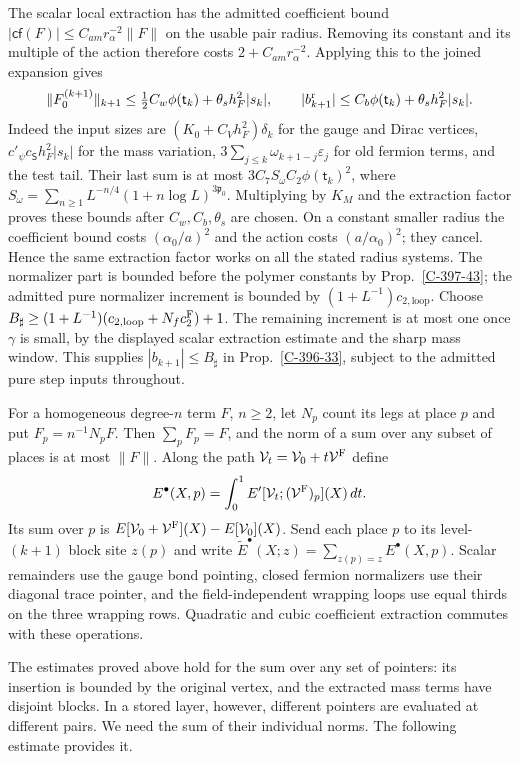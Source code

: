 \documentclass[11pt,letterpaper,reqno]{amsart}
\theoremstyle{definition}
\theoremstyle{remark}
\begin{document}
The scalar local extraction has the admitted coefficient
bound $|\mathsf{cf}(F)|\le C_{am}r_\alpha^{-2}\|F\|$ on
the usable pair radius.  Removing its constant and its
multiple of the action therefore costs
$2+C_{am}r_\alpha^{-2}$.  Applying this to the joined
expansion gives
\[
 \|F_0^{(k+1)}\|_{k+1}\le
       \tfrac12C_w\phi(\mathsf t_k)+\theta_sh_F^2|s_k|,
 \qquad |b_{k+1}^{\rm r}|\le
       C_b\phi(\mathsf t_k)+\theta_sh_F^2|s_k|.
\]
Indeed the input sizes are
$(K_0+C_Vh_F^2)\delta_k$ for the gauge and Dirac vertices,
$c'_\psi c_{\mathsf S}h_F^2|s_k|$ for the mass variation,
$3\sum_{j\le k}\omega_{k+1-j}\varepsilon_j$ for old
fermion terms, and the test tail.  Their last sum is at
most $3C_7S_\omega C_2\phi(\mathsf t_k)^2$, where
$S_\omega=\sum_{n\ge1}L^{-n/4}(1+n\log L)^{3\mathfrak p_0}$.
Multiplying by $K_M$ and the extraction factor proves
these bounds after $C_w,C_b,\theta_s$ are chosen.
On a constant smaller radius the coefficient bound
costs $(\alpha_0/a)^2$ and the action costs
$(a/\alpha_0)^2$; they cancel.  Hence the same extraction
factor works on all the stated radius systems.
The normalizer part is bounded before the polymer
constants by Prop.~\ref{C-397-43}; the admitted
pure normalizer increment is bounded by
$(1+L^{-1})c_{2,\mathrm{loop}}$.
Choose
$B_\sharp\ge(1+L^{-1})(c_{2,\mathrm{loop}}+
N_fc_2^{\rm F})+1$.
The remaining increment is at most one once
$\gamma$ is small, by the displayed scalar
extraction estimate and the sharp mass window.
This supplies $|b_{k+1}|\le B_\sharp$ in
Prop.~\ref{C-396-33}, subject to the
admitted pure step inputs throughout.

For a homogeneous degree-$n$ term $F$, $n\ge2$, let $N_p$
count its legs at place $p$ and put $F_p=n^{-1}N_pF$.
Then $\sum_pF_p=F$, and the norm of a sum over any subset
of places is at most $\|F\|$. Along the path
$\mathcal V_t=\mathcal V_0+t\mathcal V^{\rm F}$ define
\[
 E^\bullet(X,p)=\int_0^1
       E'[\mathcal V_t;(\mathcal V^{\rm F})_p](X)\,dt.
\]
Its sum over $p$ is
$E[\mathcal V_0+\mathcal V^{\rm F}](X)-E[\mathcal V_0](X)$.
Send each place $p$ to its level-$(k+1)$ block site $z(p)$
and write
$\widetilde E^\bullet(X;z)=\sum_{z(p)=z}E^\bullet(X,p)$.
Scalar remainders use the gauge bond pointing, closed
fermion normalizers use their diagonal trace pointer,
and the field-independent wrapping loops use equal
thirds on the three wrapping rows. Quadratic and cubic
coefficient extraction commutes with these operations.

The estimates proved above hold for the sum over any set
of pointers: its insertion is bounded by the original
vertex, and the extracted mass terms have disjoint blocks.
In a stored layer, however, different pointers are evaluated
at different pairs. We need the sum of their individual
norms. The following estimate provides it.
\end{document}
